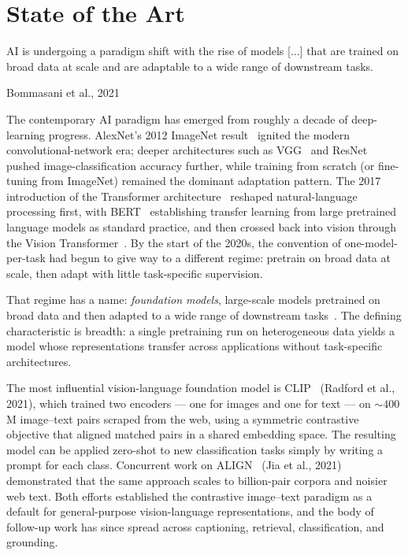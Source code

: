 \chapter{State of the Art}\label{chp:stateofart}
\epigraph{AI is undergoing a paradigm shift with the rise of models [...] that are trained on broad data at scale and are adaptable to a wide range of downstream tasks.}{Bommasani et al., 2021}

The contemporary AI paradigm has emerged from roughly a decade of deep-learning progress. AlexNet's 2012 ImageNet result~\cite{krizhevsky2012alexnet} ignited the modern convolutional-network era; deeper architectures such as VGG~\cite{simonyan2015vgg} and ResNet~\cite{he2016resnet} pushed image-classification accuracy further, while training from scratch (or fine-tuning from ImageNet) remained the dominant adaptation pattern. The 2017 introduction of the Transformer architecture~\cite{vaswani2017attention} reshaped natural-language processing first, with BERT~\cite{devlin2019bert} establishing transfer learning from large pretrained language models as standard practice, and then crossed back into vision through the Vision Transformer~\cite{dosovitskiy2021vit}. By the start of the 2020s, the convention of one-model-per-task had begun to give way to a different regime: pretrain on broad data at scale, then adapt with little task-specific supervision.

That regime has a name: \emph{foundation models}, large-scale models pretrained on broad data and then adapted to a wide range of downstream tasks~\cite{bommasani2021foundation}. The defining characteristic is breadth: a single pretraining run on heterogeneous data yields a model whose representations transfer across applications without task-specific architectures.

The most influential vision-language foundation model is CLIP~\cite{radford2021clip} (Radford et al., 2021), which trained two encoders --- one for images and one for text --- on $\sim 400$M image--text pairs scraped from the web, using a symmetric contrastive objective that aligned matched pairs in a shared embedding space. The resulting model can be applied zero-shot to new classification tasks simply by writing a prompt for each class. Concurrent work on ALIGN~\cite{jia2021align} (Jia et al., 2021) demonstrated that the same approach scales to billion-pair corpora and noisier web text. Both efforts established the contrastive image--text paradigm as a default for general-purpose vision-language representations, and the body of follow-up work has since spread across captioning, retrieval, classification, and grounding.

